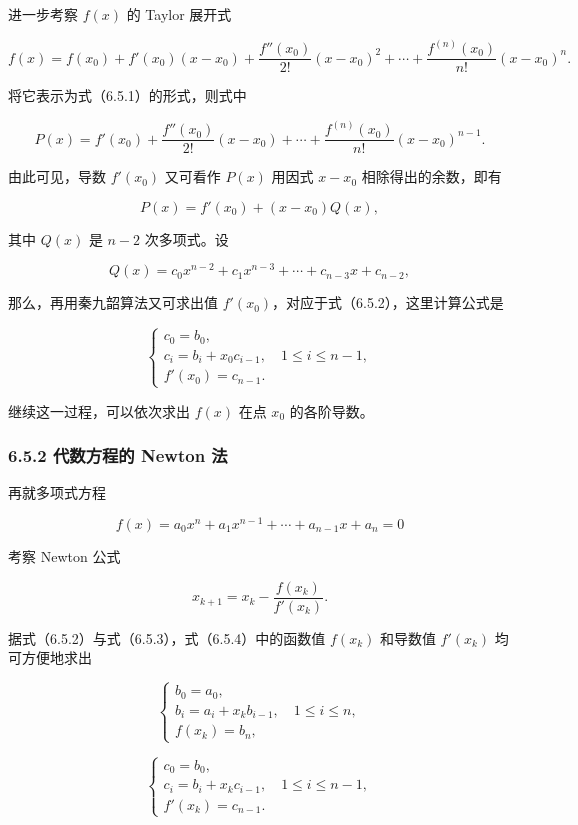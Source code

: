\documentclass[
  10pt,
  fontset=fandol]{ctexart}
\begin{document}
进一步考察 \(f(x)\) 的 Taylor 展开式

\[
f(x)=f(x_0)+f'(x_0)(x-x_0)+\frac{f''(x_0)}{2!}(x-x_0)^2+\cdots+\frac{f^{(n)}(x_0)}{n!}(x-x_0)^n.
\]

将它表示为式（6.5.1）的形式，则式中

\[
P(x)=f'(x_0)+\frac{f''(x_0)}{2!}(x-x_0)+\cdots+\frac{f^{(n)}(x_0)}{n!}(x-x_0)^{n-1}.
\]

由此可见，导数 \(f'(x_0)\) 又可看作 \(P(x)\) 用因式 \(x-x_0\) 相除得出的余数，即有

\[
P(x)=f'(x_0)+(x-x_0)Q(x),
\]

其中 \(Q(x)\) 是 \(n-2\) 次多项式。设

\[
Q(x)=c_0x^{n-2}+c_1x^{n-3}+\cdots+c_{n-3}x+c_{n-2},
\]

那么，再用秦九韶算法又可求出值 \(f'(x_0)\)，对应于式（6.5.2），这里计算公式是

\[
\begin{cases}
c_0=b_0,\\
c_i=b_i+x_0c_{i-1},\quad1\leqslant i\leqslant n-1,\\
f'(x_0)=c_{n-1}.
\end{cases}
\tag{6.5.3}
\]

继续这一过程，可以依次求出 \(f(x)\) 在点 \(x_0\) 的各阶导数。

\subsubsection{6.5.2 代数方程的 Newton 法}\label{ux4ee3ux6570ux65b9ux7a0bux7684-newton-ux6cd5}

再就多项式方程

\[
f(x)=a_0x^n+a_1x^{n-1}+\cdots+a_{n-1}x+a_n=0
\]

考察 Newton 公式

\[
x_{k+1}=x_k-\frac{f(x_k)}{f'(x_k)}.
\tag{6.5.4}
\]

据式（6.5.2）与式（6.5.3），式（6.5.4）中的函数值 \(f(x_k)\) 和导数值 \(f'(x_k)\) 均可方便地求出

\[
\begin{cases}
b_0=a_0,\\
b_i=a_i+x_kb_{i-1},\quad1\leqslant i\leqslant n,\\
f(x_k)=b_n,
\end{cases}
\tag{6.5.5}
\]

\[
\begin{cases}
c_0=b_0,\\
c_i=b_i+x_kc_{i-1},\quad1\leqslant i\leqslant n-1,\\
f'(x_k)=c_{n-1}.
\end{cases}
\tag{6.5.6}
\]
\end{document}
